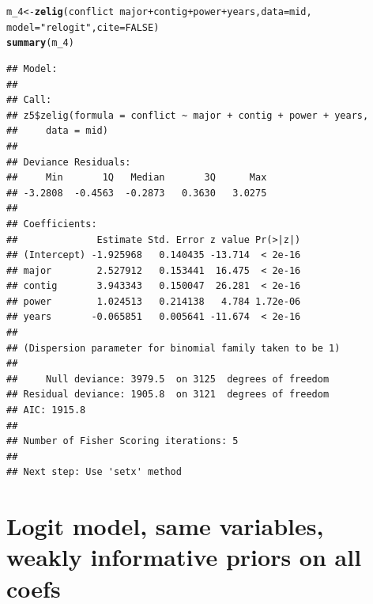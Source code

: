 \documentclass{article}\usepackage[]{graphicx}\usepackage[]{color}
\makeatletter
\newcommand{\hlnum}[1]{\textcolor[rgb]{0.686,0.059,0.569}{#1}}%
\newcommand{\hlstr}[1]{\textcolor[rgb]{0.192,0.494,0.8}{#1}}%
\newcommand{\hlopt}[1]{\textcolor[rgb]{0,0,0}{#1}}%
\newcommand{\hlstd}[1]{\textcolor[rgb]{0.345,0.345,0.345}{#1}}%
\newcommand{\hlkwb}[1]{\textcolor[rgb]{0.69,0.353,0.396}{#1}}%
\newcommand{\hlkwc}[1]{\textcolor[rgb]{0.333,0.667,0.333}{#1}}%
\newcommand{\hlkwd}[1]{\textcolor[rgb]{0.737,0.353,0.396}{\textbf{#1}}}%
\newenvironment{kframe}{%
 \def\at@end@of@kframe{}%
 \ifinner\ifhmode%
  \def\at@end@of@kframe{\end{minipage}}%
  \begin{minipage}{\columnwidth}%
 \fi\fi%
 \def\FrameCommand##1{\hskip\@totalleftmargin \hskip-\fboxsep
 \colorbox{shadecolor}{##1}\hskip-\fboxsep
     \hskip-\linewidth \hskip-\@totalleftmargin \hskip\columnwidth}%
 \MakeFramed {\advance\hsize-\width
   \@totalleftmargin\z@ \linewidth\hsize
   \@setminipage}}%
 {\par\unskip\endMakeFramed%
 \at@end@of@kframe}
\newenvironment{knitrout}{}{} %
\makeatother
\begin{document}
\begin{knitrout}
\color{fgcolor}\begin{kframe}
\begin{alltt}
\hlstd{m_4} \hlkwb{<-} \hlkwd{zelig}\hlstd{(conflict} \hlopt{~} \hlstd{major} \hlopt{+} \hlstd{contig} \hlopt{+} \hlstd{power} \hlopt{+} \hlstd{years,} \hlkwc{data} \hlstd{= mid,}
             \hlkwc{model} \hlstd{=} \hlstr{"relogit"}\hlstd{,} \hlkwc{cite} \hlstd{=} \hlnum{FALSE}\hlstd{)}
\hlkwd{summary}\hlstd{(m_4)}
\end{alltt}
\begin{verbatim}
## Model: 
## 
## Call:
## z5$zelig(formula = conflict ~ major + contig + power + years, 
##     data = mid)
## 
## Deviance Residuals: 
##     Min       1Q   Median       3Q      Max  
## -3.2808  -0.4563  -0.2873   0.3630   3.0275  
## 
## Coefficients:
##              Estimate Std. Error z value Pr(>|z|)
## (Intercept) -1.925968   0.140435 -13.714  < 2e-16
## major        2.527912   0.153441  16.475  < 2e-16
## contig       3.943343   0.150047  26.281  < 2e-16
## power        1.024513   0.214138   4.784 1.72e-06
## years       -0.065851   0.005641 -11.674  < 2e-16
## 
## (Dispersion parameter for binomial family taken to be 1)
## 
##     Null deviance: 3979.5  on 3125  degrees of freedom
## Residual deviance: 1905.8  on 3121  degrees of freedom
## AIC: 1915.8
## 
## Number of Fisher Scoring iterations: 5
## 
## Next step: Use 'setx' method
\end{verbatim}
\end{kframe}
\end{knitrout}

\section{Logit model, same variables, weakly informative priors on all coefs}
\end{document}
